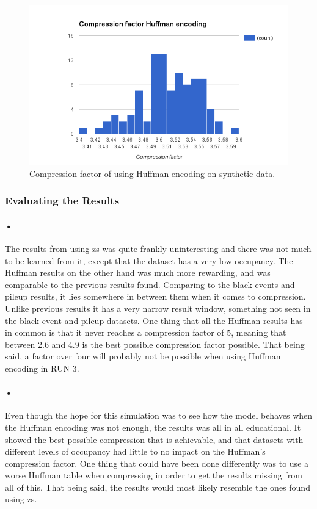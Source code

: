\documentclass[a4paper, 12pt]{report}
\begin{document}
\begin{figure}[h!]
	\centering
		\includegraphics[width=1.0\textwidth]{images/huffman-comp-fake-pileup.png}
		\caption{Compression factor of using Huffman encoding on synthetic data.}
		\label{fig:compression-factor-huffman-synt}
\end{figure}

\subsubsection{Evaluating the Results}

\paragraph{•}
The results from using \gls{zs} was quite frankly uninteresting and there was not much to be learned from it, except that the dataset has a very low occupancy.
The Huffman results on the other hand was much more rewarding, and was comparable to the previous results found.
Comparing to the black events and pileup results, it lies somewhere in between them when it comes to compression.
Unlike previous results it has a very narrow result window, something not seen in the black event and pileup datasets.
One thing that all the Huffman results has in common is that it never reaches a compression factor of 5, meaning that between 2.6 and 4.9 is the best possible compression factor possible.
That being said, a factor over four will probably not be possible when using Huffman encoding in RUN 3.

\paragraph{•}
Even though the hope for this simulation was to see how the model behaves when the Huffman encoding was not enough, the results was all in all educational.
It showed the best possible compression that is achievable, and that datasets with different levels of occupancy had little to no impact on the Huffman's compression factor.
One thing that could have been done differently was to use a worse Huffman table when compressing in order to get the results missing from all of this.
That being said, the results would most likely resemble the ones found using \gls{zs}.
\end{document}
